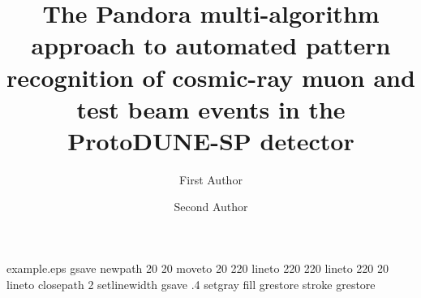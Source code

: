 
%
%
%
%
%
\begin{filecontents*}{example.eps}
gsave
newpath
  20 20 moveto
  20 220 lineto
  220 220 lineto
  220 20 lineto
closepath
2 setlinewidth
gsave
  .4 setgray fill
grestore
stroke
grestore
\end{filecontents*}
%
\RequirePackage{fix-cm}
%
\documentclass{svjour3}                     %
%
\smartqed  %
%
\usepackage{graphicx}
\usepackage{caption}    
\usepackage{subfig} 
%
%
%
%
%


\title{The Pandora multi-algorithm approach to automated pattern recognition of cosmic-ray muon and test beam events in the ProtoDUNE-SP detector
}


\author{First Author         \and
        Second Author %
}


